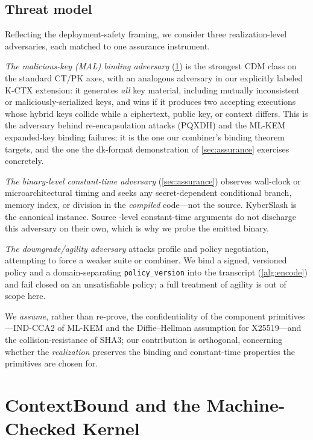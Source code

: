\documentclass[journal]{IEEEtran}
\newcommand{\code}[1]{\texttt{\small #1}}
\begin{document}
\subsection{Threat model}
Reflecting the deployment-safety framing, we consider three realization-level adversaries, each
matched to one assurance instrument.

\emph{The malicious-key (MAL) binding adversary} (\cref{sec:kernel}) is the strongest CDM class on
the standard CT/PK axes, with an analogous adversary in our explicitly labeled K-CTX extension: it
generates \emph{all} key material, including mutually inconsistent or maliciously-serialized keys,
and wins if it produces two accepting executions whose hybrid keys collide while a ciphertext,
public key, or context differs. This is the adversary behind re-encapsulation attacks (PQXDH) and
the ML-KEM expanded-key binding failures; it is the one our combiner's binding theorem targets, and
the one the dk-format demonstration of \cref{sec:assurance} exercises concretely.

\emph{The binary-level constant-time adversary} (\cref{sec:assurance}) observes wall-clock or
microarchitectural timing and seeks any secret-dependent conditional branch, memory index, or
division in the \emph{compiled} code---not the source. KyberSlash is the canonical instance. Source
-level constant-time arguments do not discharge this adversary on their own, which is why we probe
the emitted binary.

\emph{The downgrade/agility adversary} attacks profile and policy negotiation, attempting to force a
weaker suite or combiner. We bind a signed, versioned policy and a domain-separating
\code{policy\_version} into the transcript (\cref{alg:encode}) and fail closed on an unsatisfiable
policy; a full treatment of agility is out of scope here.

We \emph{assume}, rather than re-prove, the confidentiality of the component primitives---IND-CCA2 of
ML-KEM and the Diffie--Hellman assumption for X25519---and the collision-resistance of SHA3; our
contribution is orthogonal, concerning whether the \emph{realization} preserves the binding and
constant-time properties the primitives are chosen for.

\section{ContextBound and the Machine-Checked Kernel}\label{sec:kernel}
\end{document}
